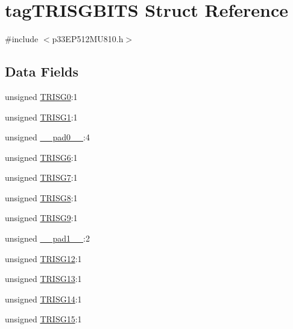 \hypertarget{structtag_t_r_i_s_g_b_i_t_s}{}\section{tag\+T\+R\+I\+S\+G\+B\+I\+TS Struct Reference}
\label{structtag_t_r_i_s_g_b_i_t_s}


{\ttfamily \#include $<$p33\+E\+P512\+M\+U810.\+h$>$}

\subsection*{Data Fields}
\begin{DoxyCompactItemize}
\item 
unsigned \hyperlink{structtag_t_r_i_s_g_b_i_t_s_a1f5dd3918243eb40109ef2f0e6b83432}{T\+R\+I\+S\+G0}\+:1
\item 
unsigned \hyperlink{structtag_t_r_i_s_g_b_i_t_s_aa6193034142962c0618d8ea183bb36cf}{T\+R\+I\+S\+G1}\+:1
\item 
unsigned \hyperlink{structtag_t_r_i_s_g_b_i_t_s_adf71f3d8410c1f1dbbc96680a92c49af}{\+\_\+\+\_\+pad0\+\_\+\+\_\+}\+:4
\item 
unsigned \hyperlink{structtag_t_r_i_s_g_b_i_t_s_ae90320eac1b72a921cd95ec5f6d22820}{T\+R\+I\+S\+G6}\+:1
\item 
unsigned \hyperlink{structtag_t_r_i_s_g_b_i_t_s_abbd1edcc4f9dc45782af5c2daca7aa0a}{T\+R\+I\+S\+G7}\+:1
\item 
unsigned \hyperlink{structtag_t_r_i_s_g_b_i_t_s_a28536e7ea40455683e0444841d272110}{T\+R\+I\+S\+G8}\+:1
\item 
unsigned \hyperlink{structtag_t_r_i_s_g_b_i_t_s_a03565ad5659d5d41aaf64ff16a7134bd}{T\+R\+I\+S\+G9}\+:1
\item 
unsigned \hyperlink{structtag_t_r_i_s_g_b_i_t_s_acaf2d0924a107ec6e8d2e31febaf66f9}{\+\_\+\+\_\+pad1\+\_\+\+\_\+}\+:2
\item 
unsigned \hyperlink{structtag_t_r_i_s_g_b_i_t_s_a64b0d745ab8de7883b2768e562795648}{T\+R\+I\+S\+G12}\+:1
\item 
unsigned \hyperlink{structtag_t_r_i_s_g_b_i_t_s_a04d0b2690f3eb14c6e4329687c6ccc1f}{T\+R\+I\+S\+G13}\+:1
\item 
unsigned \hyperlink{structtag_t_r_i_s_g_b_i_t_s_a6344a9317b573716c503be0d5ede62e9}{T\+R\+I\+S\+G14}\+:1
\item 
unsigned \hyperlink{structtag_t_r_i_s_g_b_i_t_s_a88d25a7945a299c498e036b7111e674c}{T\+R\+I\+S\+G15}\+:1
\end{DoxyCompactItemize}


